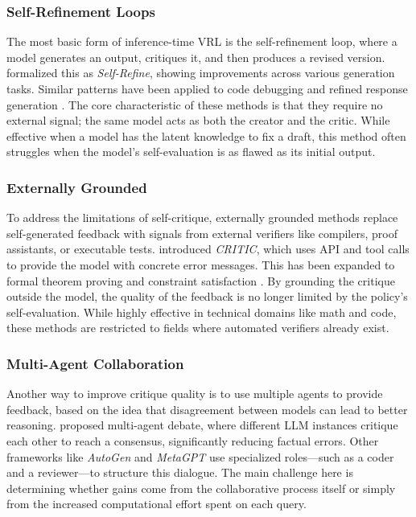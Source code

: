 \subsubsection{Self-Refinement Loops}

The most basic form of inference-time VRL is the self-refinement loop, where a model generates an output, critiques it, and then produces a revised version. \citet{madaan2023selfrefine} formalized this as \textit{Self-Refine}, showing improvements across various generation tasks. Similar patterns have been applied to code debugging \citep{chen2023selfdebug} and refined response generation \citep{lee2025feedback}. The core characteristic of these methods is that they require no external signal; the same model acts as both the creator and the critic. While effective when a model has the latent knowledge to fix a draft, this method often struggles when the model's self-evaluation is as flawed as its initial output.

\subsubsection{Externally Grounded}

To address the limitations of self-critique, externally grounded methods replace self-generated feedback with signals from external verifiers like compilers, proof assistants, or executable tests. \citet{gou2024critic} introduced \textit{CRITIC}, which uses API and tool calls to provide the model with concrete error messages. This has been expanded to formal theorem proving \citep{first2023baldur} and constraint satisfaction \citep{ferraz2024decrim}. By grounding the critique outside the model, the quality of the feedback is no longer limited by the policy’s self-evaluation. While highly effective in technical domains like math and code, these methods are restricted to fields where automated verifiers already exist.

\subsubsection{Multi-Agent Collaboration}

Another way to improve critique quality is to use multiple agents to provide feedback, based on the idea that disagreement between models can lead to better reasoning. \citet{du2023debate} proposed multi-agent debate, where different LLM instances critique each other to reach a consensus, significantly reducing factual errors. Other frameworks like \textit{AutoGen} \citep{wu2023autogen} and \textit{MetaGPT} \citep{hong2024metagpt} use specialized roles—such as a coder and a reviewer—to structure this dialogue. The main challenge here is determining whether gains come from the collaborative process itself or simply from the increased computational effort spent on each query.

